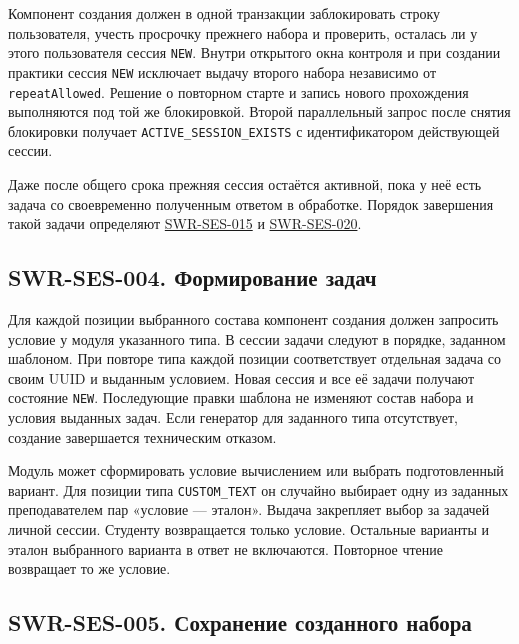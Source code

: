 \documentclass[12pt,a4paper]{article}
\begin{document}
\hypertarget{swr-ses-003-защита-от-двух-активных-сессий}{}

\hypertarget{swr-ses-003}{}

Компонент создания должен в одной транзакции заблокировать строку пользователя, учесть просрочку прежнего набора и проверить, осталась ли у этого пользователя сессия \texttt{NEW}. Внутри открытого окна контроля и при создании практики сессия \texttt{NEW} исключает выдачу второго набора независимо от \texttt{repeatAllowed}. Решение о повторном старте и запись нового прохождения выполняются под той же блокировкой. Второй параллельный запрос после снятия блокировки получает \texttt{ACTIVE\_\allowbreak{}SESSION\_\allowbreak{}EXISTS} с идентификатором действующей сессии.

Даже после общего срока прежняя сессия остаётся активной, пока у неё есть задача со своевременно полученным ответом в обработке. Порядок завершения такой задачи определяют {\hyperlink{swr-ses-015}{SWR-SES-015}} и {\hyperlink{swr-ses-020}{SWR-SES-020}}.

\subsection{SWR-SES-004. Формирование задач}\label{swr-ses-004-ux444ux43eux440ux43cux438ux440ux43eux432ux430ux43dux438ux435-ux437ux430ux434ux430ux447}

\hypertarget{swr-ses-004-формирование-задач}{}

\hypertarget{swr-ses-004}{}

Для каждой позиции выбранного состава компонент создания должен запросить условие у модуля указанного типа. В сессии задачи следуют в порядке, заданном шаблоном. При повторе типа каждой позиции соответствует отдельная задача со своим UUID и выданным условием. Новая сессия и все её задачи получают состояние \texttt{NEW}. Последующие правки шаблона не изменяют состав набора и условия выданных задач. Если генератор для заданного типа отсутствует, создание завершается техническим отказом.

Модуль может сформировать условие вычислением или выбрать подготовленный вариант. Для позиции типа \texttt{CUSTOM\_\allowbreak{}TEXT} он случайно выбирает одну из заданных преподавателем пар «условие --- эталон». Выдача закрепляет выбор за задачей личной сессии. Студенту возвращается только условие. Остальные варианты и эталон выбранного варианта в ответ не включаются. Повторное чтение возвращает то же условие.

\subsection{SWR-SES-005. Сохранение созданного набора}\label{swr-ses-005-ux441ux43eux445ux440ux430ux43dux435ux43dux438ux435-ux441ux43eux437ux434ux430ux43dux43dux43eux433ux43e-ux43dux430ux431ux43eux440ux430}
\end{document}

